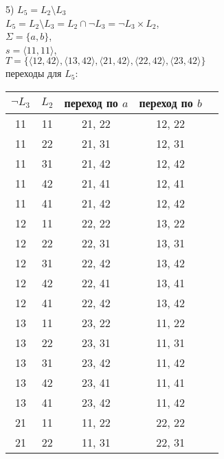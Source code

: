 \documentclass[a4paper,12pt]{article}
\begin{document}
 







5) $ L_5= L_2 \setminus L_3 $ \\

$ L_5= L_2 \setminus L_3 = L_2 \cap \neg L_3 = \neg L_3 \times L_2 $, \\

$\Sigma=\{a,b\}$, \\
$s=\langle11,11\rangle$, \\
$T=\{\langle12,42\rangle, \langle13,42\rangle, \langle21,42\rangle, \langle22,42\rangle,\langle23,42\rangle\}$\\

переходы для $L_5$: 
\begin{center}
    \begin{tabular}{ |c|c|c|c|c| } 
        \hline
        $\neg L_3$ & $L_2$ & переход по $a$ & переход по $b$ \\
        \hline
        11 & 11 & 21, 22 & 12, 22 \\
        \hline 
        11 & 22 & 21, 31 & 12, 31 \\
        \hline
        11 & 31 & 21, 42 & 12, 42 \\
        \hline
        11 & 42 & 21, 41 & 12, 41 \\
        \hline
        11 & 41 & 21, 42 & 12, 42 \\
        \hline
        12 & 11 & 22, 22 & 13, 22 \\
        \hline
        12 & 22 & 22, 31 & 13, 31 \\
        \hline
        12 & 31 & 22, 42 & 13, 42 \\
        \hline
        12 & 42 & 22, 41 & 13, 41 \\
        \hline
        12 & 41 & 22, 42 & 13, 42 \\
        \hline
        13 & 11 & 23, 22 & 11, 22  \\
        \hline
        13 & 22 & 23, 31 & 11, 31 \\
        \hline
        13 & 31 & 23, 42 & 11, 42 \\
        \hline
        13 & 42 & 23, 41 & 11, 41 \\
        \hline
        13 & 41 & 23, 42 & 11, 42 \\
        \hline
        21 & 11 & 11, 22 & 22, 22 \\
        \hline
        21 & 22 & 11, 31 & 22, 31 \\

\end{tabular}
\end{center}
\end{document}
